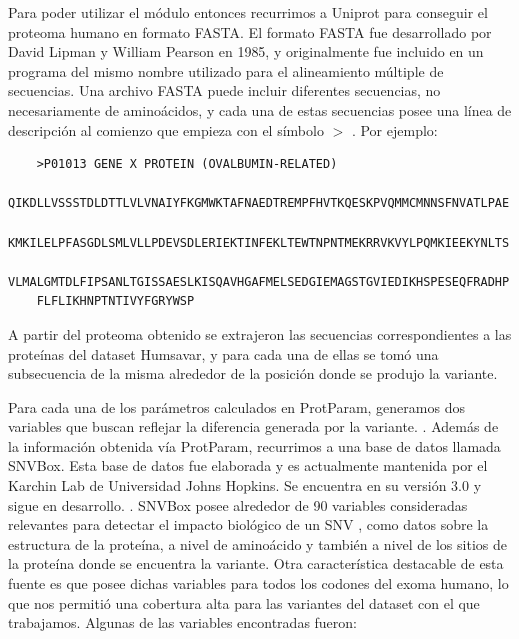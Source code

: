 Para poder utilizar el módulo entonces recurrimos a Uniprot para conseguir el proteoma humano en formato FASTA. El formato FASTA fue desarrollado por David Lipman y William Pearson en 1985, y originalmente fue incluido en un programa del mismo nombre utilizado para el alineamiento múltiple de secuencias. Una archivo FASTA puede incluir diferentes secuencias, no necesariamente de aminoácidos, y cada una de estas secuencias posee una línea de descripción al comienzo que empieza con el símbolo $>$ \todo{[citar]}. Por ejemplo:

\begin{verbatim}
	>P01013 GENE X PROTEIN (OVALBUMIN-RELATED)
	QIKDLLVSSSTDLDTTLVLVNAIYFKGMWKTAFNAEDTREMPFHVTKQESKPVQMMCMNNSFNVATLPAE
	KMKILELPFASGDLSMLVLLPDEVSDLERIEKTINFEKLTEWTNPNTMEKRRVKVYLPQMKIEEKYNLTS
	VLMALGMTDLFIPSANLTGISSAESLKISQAVHGAFMELSEDGIEMAGSTGVIEDIKHSPESEQFRADHP
	FLFLIKHNPTNTIVYFGRYWSP
\end{verbatim}


A partir del proteoma obtenido se extrajeron las secuencias correspondientes a las proteínas del dataset Humsavar, y para cada una de ellas se tomó una subsecuencia de la misma alrededor de la posición donde se produjo la variante.

\vspace{2mm}
\vspace{2mm}

Para cada una de los parámetros calculados en ProtParam, generamos dos variables que buscan reflejar la diferencia generada por la variante. .
Además de la información obtenida vía ProtParam, recurrimos a una base de datos llamada SNVBox. Esta base de datos fue elaborada y es actualmente mantenida por el Karchin Lab de Universidad Johns Hopkins. Se encuentra en su versión 3.0 y sigue en desarrollo. . SNVBox posee alrededor de 90 variables consideradas relevantes para detectar el impacto biológico de un SNV \cite{Wong2011}, como datos sobre la estructura de la proteína, a nivel de aminoácido y también a nivel de los sitios de la proteína donde se encuentra la variante. Otra característica destacable de esta fuente es que posee dichas variables para todos los codones del exoma humano, lo que nos permitió una cobertura alta para las variantes del dataset con el que trabajamos.
Algunas de las variables encontradas fueron:

\vspace{2mm}
\vspace{2mm}

